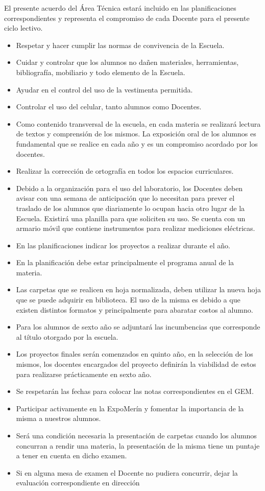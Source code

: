 \documentclass[main]{subfiles}
\begin{document}
El presente acuerdo del Área Técnica estará incluido en las planificaciones correspondientes y representa el compromiso de cada Docente para el
presente ciclo lectivo.
\begin{itemize}
    \item Respetar y hacer cumplir las normas de convivencia de la Escuela.
\item Cuidar y controlar que los alumnos no dañen materiales, herramientas, bibliografía,
mobiliario y todo elemento de la Escuela.
\item Ayudar en el control del uso de la vestimenta permitida.
\item Controlar el uso del celular, tanto alumnos como Docentes.
\item Como contenido transversal de la escuela, en cada materia se realizará lectura de
textos y comprensión de los mismos. La exposición oral de los alumnos es fundamental
que se realice en cada año y es un compromiso acordado por los docentes.
\item Realizar la corrección de ortografía en todos los espacios curriculares.
\item Debido a la organización para el uso del laboratorio, los Docentes deben avisar con
una semana de anticipación que lo necesitan para prever el traslado de los alumnos
que diariamente lo ocupan hacia otro lugar de la Escuela. Existirá una planilla para que
soliciten su uso. Se cuenta con un armario móvil que contiene instrumentos para
realizar mediciones eléctricas.
\item En las planificaciones indicar los proyectos a realizar durante el año.
\item En la planificación debe estar principalmente el programa anual de la materia.
\item Las carpetas que se realicen en hoja normalizada, deben utilizar la nueva hoja que se
puede adquirir en biblioteca. El uso de la misma es debido a que existen distintos
formatos y principalmente para abaratar costos al alumno.
\item Para los alumnos de sexto año se adjuntará las incumbencias que corresponde al título
otorgado por la escuela.
\item Los proyectos finales serán comenzados en quinto año, en la selección de los mismos,
los docentes encargados del proyecto definirán la viabilidad de estos para realizarse
prácticamente en sexto año.
\item Se respetarán las fechas para colocar las notas correspondientes en el GEM.
\item Participar activamente en la ExpoMerín y fomentar la importancia de la misma a
nuestros alumnos.
\item Será una condición necesaria la presentación de carpetas cuando los alumnos
concurran a rendir una materia, la presentación de la misma tiene un puntaje a tener
en cuenta en dicho examen.
\item Si en alguna mesa de examen el Docente no pudiera concurrir, dejar la evaluación
correspondiente en dirección
\end{itemize}
\end{document}
